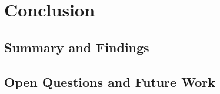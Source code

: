 %
\chapter{Conclusion}
\label{sec:conclusion}

\Blindtext

\section{Summary and Findings}
\label{sec:conclusion:summary}

\Blindtext

\section{Open Questions and Future Work}
\label{sec:conclusion:future}

\Blindtext
